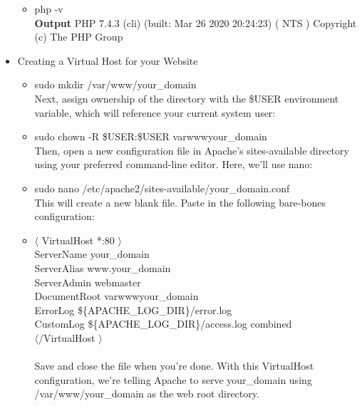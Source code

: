 \documentclass[10pt]{report}
\begin{document}
\begin{itemize}
\begin{itemize}
\item{php -v} 
\\ \textbf{Output}
PHP 7.4.3 (cli) (built: Mar 26 2020 20:24:23) ( NTS )
Copyright (c) The PHP Group
\end{itemize}
\item{Creating a Virtual Host for your Website}
\begin{itemize}
\item{sudo mkdir /var/www/your\_domain} \\
Next, assign ownership of the directory with the \$USER environment variable, which will reference your current system user:
\item{sudo chown -R \$USER:\$USER \/var\/www\/your\_domain} \\
Then, open a new configuration file in Apache’s sites-available directory using your preferred command-line editor. Here, we’ll use nano:
\item{sudo nano /etc/apache2/sites-available/your\_domain.conf} \\
This will create a new blank file. Paste in the following bare-bones configuration:
\item{$\langle$ VirtualHost *:80 $\rangle$ \\
ServerName your\_domain \\
ServerAlias www.your\_domain \\
ServerAdmin webmaster\@localhost \\
DocumentRoot \/var\/www\/your\_domain \\
ErrorLog \$\{APACHE\_LOG\_DIR\}/error.log \\
CustomLog \$\{APACHE\_LOG\_DIR\}/access.log combined \\ 
$\langle$/VirtualHost $\rangle$} \\ \\ 
Save and close the file when you’re done. With this VirtualHost configuration, we’re telling Apache to serve your\_domain using
/var/www/your\_domain as the web root directory.
\end{itemize}
\end{itemize}
\end{document}
